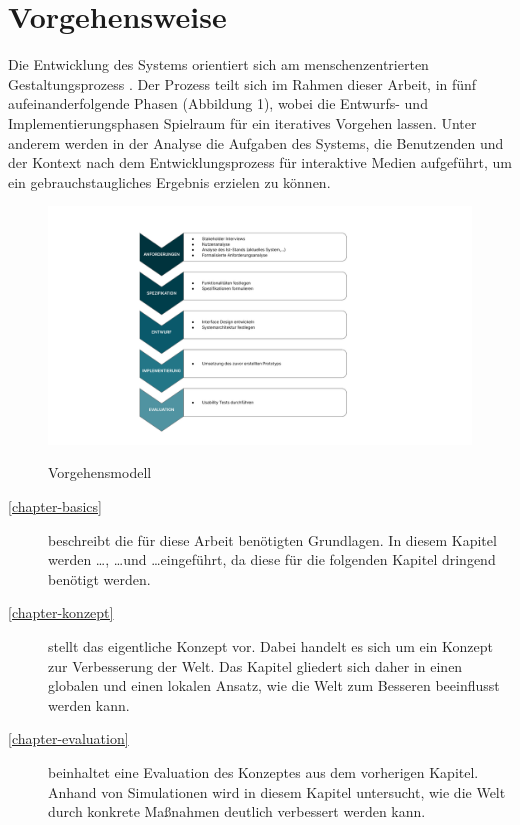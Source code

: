 \section{Vorgehensweise}
Die Entwicklung des Systems orientiert sich am menschenzentrierten Gestaltungsprozess \cite{din_en_iso_9421-2102020-03_din_nodate}. Der Prozess teilt sich im Rahmen dieser Arbeit, in fünf aufeinanderfolgende
Phasen (Abbildung 1), wobei die Entwurfs- und Implementierungsphasen Spielraum für ein iteratives
Vorgehen lassen. Unter anderem werden in der Analyse die Aufgaben des Systems, die Benutzenden
und der Kontext nach dem Entwicklungsprozess für interaktive Medien \cite{herczeg_einfuhrung_2009} aufgeführt,
um ein gebrauchstaugliches Ergebnis erzielen zu können.

\begin{figure}[h]
  \centering
  \includegraphics[scale=0.6]{Bilder/Vorgehensmodell.pptx.pdf}
  \label{fig:schablone}
  \caption[Vorgehensmodell]{Vorgehensmodell}
\end{figure}

\begin{description}
  \item[\ref{chapter-basics}] beschreibt die für diese Arbeit benötigten Grundlagen. In diesem Kapitel werden \ldots, \ldots und \ldots eingeführt, da diese für die folgenden Kapitel dringend benötigt werden.
  \item[\ref{chapter-konzept}] stellt das eigentliche Konzept vor. Dabei handelt es sich um ein Konzept zur Verbesserung der Welt. Das Kapitel gliedert sich daher in einen globalen und einen lokalen Ansatz, wie die Welt zum Besseren beeinflusst werden kann.
  \item[\ref{chapter-evaluation}] beinhaltet eine Evaluation des Konzeptes aus dem vorherigen Kapitel. Anhand von Simulationen wird in diesem Kapitel untersucht, wie die Welt durch konkrete Maßnahmen deutlich verbessert werden kann.
\end{description}

